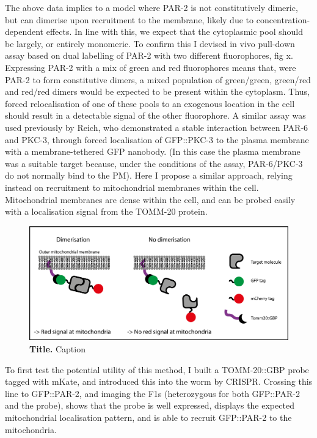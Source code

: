 \documentclass[12pt]{"article"}
\newcommand{\mycaption}[2]{\caption[#1]{\textbf{#1.} #2}}
\begin{document}
The above data implies to a model where PAR-2 is not constitutively dimeric, but can dimerise upon recruitment to the membrane, likely due to concentration-dependent effects. In line with this, we expect that the cytoplasmic pool should be largely, or entirely monomeric. To confirm this I devised in vivo pull-down assay based on dual labelling of PAR-2 with two different fluorophores, fig x. Expressing PAR-2 with a mix of green and red fluorophores means that, were PAR-2 to form constitutive dimers, a mixed population of green/green, green/red and red/red dimers would be expected to be present within the cytoplasm. Thus, forced relocalisation of one of these pools to an exogenous location in the cell should result in a detectable signal of the other fluorophore. A similar assay was used previously by Reich, who demonstrated a stable interaction between PAR-6 and PKC-3, through forced localisation of GFP::PKC-3 to the plasma membrane with a membrane-tethered GFP nanobody. (In this case the plasma membrane was a suitable target because, under the conditions of the assay, PAR-6/PKC-3 do not normally bind to the PM). Here I propose a similar approach, relying instead on recruitment to mitochondrial membranes within the cell. Mitochondrial membranes are dense within the cell, and can be probed easily with a localisation signal from the TOMM-20 protein.\\

\begin{figure}[!h]
\includegraphics[scale=0.95]{tomm20_schematic}
\setlength{\abovecaptionskip}{20pt}
\centering
\mycaption{Title}{Caption}
\end{figure}

To first test the potential utility of this method, I built a TOMM-20::GBP probe tagged with mKate, and introduced this into the worm by CRISPR. Crossing this line to GFP::PAR-2, and imaging the F1s (heterozygous for both GFP::PAR-2 and the probe), shows that the probe is well expressed, displays the expected mitochondrial localisation pattern, and is able to recruit GFP::PAR-2 to the mitochondria.\\
\end{document}
